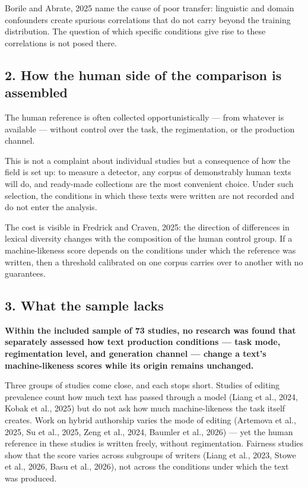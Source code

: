 \documentclass[11pt,a4paper]{article}
\renewcommand{\_}{\textunderscore\allowbreak}
\begin{document}
Borile and Abrate, 2025 name the cause of poor transfer: linguistic and domain confounders
create spurious correlations that do not carry beyond the training distribution.
The question of which specific conditions give rise to these correlations is not posed there.

\subsection{2. How the human side of the comparison is assembled}

The human reference is often collected opportunistically — from whatever is available —
without control over the task, the regimentation, or the production channel.

This is not a complaint about individual studies but a consequence of how the field
is set up: to measure a detector, any corpus of demonstrably human texts will do, and
ready-made collections are the most convenient choice. Under such selection, the
conditions in which these texts were written are not recorded and do not enter the analysis.

The cost is visible in Fredrick and Craven, 2025: the direction of differences in lexical diversity changes
with the composition of the human control group. If a machine-likeness score
depends on the conditions under which the reference was written, then a threshold
calibrated on one corpus carries over to another with no guarantees.

\subsection{3. What the sample lacks}

\textbf{Within the included sample of 73 studies, no research was found that separately
assessed how text production conditions — task mode, regimentation level,
and generation channel — change a text's machine-likeness scores
while its origin remains unchanged.}

Three groups of studies come close, and each stops short. Studies of
editing prevalence count how much text has passed through a model (Liang et al., 2024,
Kobak et al., 2025) but do not ask how much machine-likeness the task itself creates. Work on
hybrid authorship varies the mode of editing (Artemova et al., 2025, Su et al., 2025, Zeng et al., 2024, Baumler et al., 2026) — yet
the human reference in these studies is written freely, without regimentation. Fairness studies
show that the score varies across subgroups of writers (Liang et al., 2023, Stowe et al., 2026, Basu et al., 2026), not across the
conditions under which the text was produced.
\end{document}
